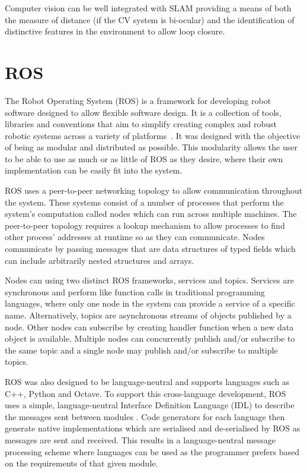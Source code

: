 Computer vision can be well integrated with SLAM providing a means of both the measure
of distance (if the CV system is bi-ocular) and the identification of distinctive
features in the environment to allow loop closure\cite{CVho2006loop}.

\section{ROS}\label{litreview/ROS}
The Robot Operating System (ROS) is a framework for developing robot
software designed to allow flexible software design. It is a collection of tools, 
libraries and conventions that aim to simplify creating complex and 
robust robotic systems across a variety of platforms~\cite{aboutROS}. 
It was designed with the objective of being as modular and distributed
as possible. This modularity allows the user to be able to use as much or
as little of ROS as they desire, where their own implementation can be
easily fit into the system. \cite{rosForMe}

ROS uses a peer-to-peer networking topology to allow communication 
throughout the system. These systems consist of a number of processes  
that perform the system's computation called nodes which can  
run across multiple machines. The peer-to-peer topology requires 
a lookup mechanism to allow processes to find other process' addresses at 
runtime so as they can communicate. Nodes communicate by passing messages 
that are data structures of typed fields which can include arbitrarily nested 
structures and arrays. \cite{crick2017rosbridge}

Nodes can using two distinct ROS frameworks, services and topics. 
Services are synchronous and perform like function
calls in traditional programming languages, where only one node in the 
system can provide a service of a specific name. Alternatively, topics are
asynchronous streams of objects published by a node. Other nodes can 
subscribe by creating  handler function when a new data object is available.
Multiple nodes can concurrently publish and/or subscribe to the same topic and
a single node may publish and/or subscribe to multiple topics.

ROS was also designed to be language-neutral and supports languages 
such as C++, Python and Octave. To support this cross-language 
development, ROS uses a simple, language-neutral Interface Definition 
Language (IDL) to describe the messages sent between modules 
\cite{quigley2009ros}. Code generators for each language then generate 
native implementations which are serialised and de-serialised by ROS 
as messages are sent and received. This results in a language-neutral 
message processing scheme where languages can be used as the programmer 
prefers based on the requirements of that given module. 

